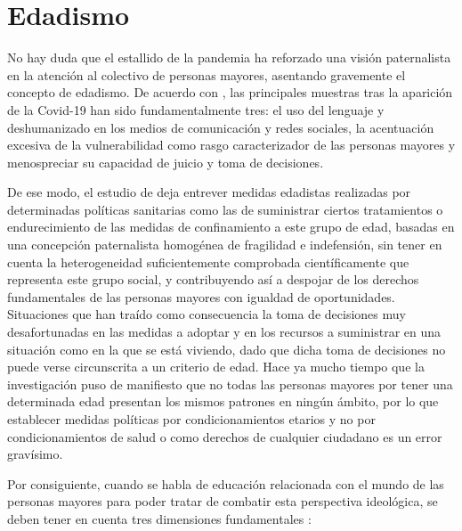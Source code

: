 \documentclass[spanish]{textolivre}
\begin{document}
\section{Edadismo}
No hay duda que el estallido de la pandemia ha reforzado una visión paternalista en la atención al colectivo de personas mayores, asentando gravemente el concepto de edadismo. De acuerdo con \textcite{helpage2020b}, %
las principales muestras tras la aparición de la Covid-19 han sido fundamentalmente tres: el uso del lenguaje y deshumanizado en los medios de comunicación y redes sociales, la acentuación excesiva de la vulnerabilidad como rasgo caracterizador de las personas mayores y menospreciar su capacidad de juicio y toma de decisiones.

De ese modo, el estudio de \textcite{bravovillar2020} %
deja entrever medidas edadistas realizadas por determinadas políticas sanitarias como las de suministrar ciertos tratamientos o endurecimiento de las medidas de confinamiento a este grupo de edad, basadas en una concepción paternalista homogénea de fragilidad e indefensión, sin tener en cuenta la heterogeneidad suficientemente comprobada científicamente que representa este grupo social, y contribuyendo así a despojar de los derechos fundamentales de las personas mayores con igualdad de oportunidades. Situaciones que han traído como consecuencia la toma de decisiones muy desafortunadas en las medidas a adoptar y en los recursos a suministrar en una situación como en la que se está viviendo, dado que dicha toma de decisiones no puede verse circunscrita a un criterio de edad. Hace ya mucho tiempo que la investigación puso de manifiesto que no todas las personas mayores por tener una determinada edad presentan los mismos patrones en ningún ámbito, por lo que establecer medidas políticas por condicionamientos etarios y no por condicionamientos de salud o como derechos de cualquier ciudadano es un error gravísimo.

Por consiguiente, cuando se habla de educación relacionada con el mundo de las personas mayores para poder tratar de combatir esta perspectiva ideológica, se deben tener en cuenta tres dimensiones fundamentales \textcite{martinezdemiguel2016}: %
\end{document}
